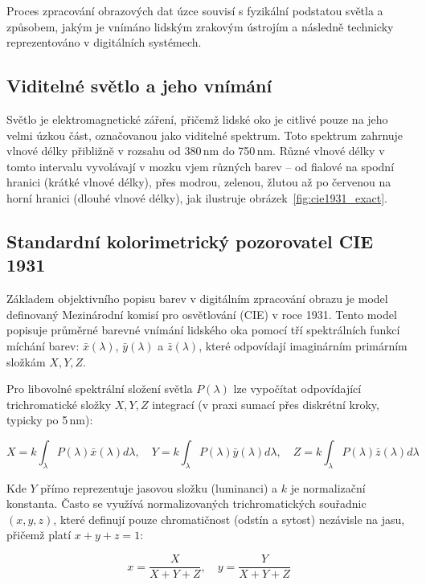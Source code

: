 \documentclass[FM,DP]{tulthesis}
\begin{document}
Proces zpracování obrazových dat úzce souvisí s fyzikální podstatou světla a
způsobem, jakým je vnímáno lidským zrakovým ústrojím a následně technicky
reprezentováno v digitálních systémech.

\subsection{Viditelné světlo a jeho vnímání}
Světlo je elektromagnetické záření, přičemž lidské oko je citlivé pouze na jeho
velmi úzkou část, označovanou jako viditelné spektrum. Toto spektrum zahrnuje
vlnové délky přibližně v rozsahu od 380\,nm do 750\,nm. Různé vlnové délky v
tomto intervalu vyvolávají v mozku vjem různých barev – od fialové na spodní
hranici (krátké vlnové délky), přes modrou, zelenou, žlutou až po červenou na
horní hranici (dlouhé vlnové délky), jak ilustruje
obrázek~\ref{fig:cie1931_exact}.

\subsection{Standardní kolorimetrický pozorovatel CIE 1931}
Základem objektivního popisu barev v digitálním zpracování obrazu je model
definovaný Mezinárodní komisí pro osvětlování (CIE) v roce 1931. Tento model
popisuje průměrné barevné vnímání lidského oka pomocí tří spektrálních funkcí
míchání barev: $\bar{x}(\lambda)$, $\bar{y}(\lambda)$ a $\bar{z}(\lambda)$,
které odpovídají imaginárním primárním složkám $X, Y, Z$.

Pro libovolné spektrální složení světla $P(\lambda)$ lze vypočítat odpovídající
trichromatické složky $X, Y, Z$ integrací (v praxi sumací přes diskrétní kroky,
typicky po 5\,nm):

\begin{equation}
    X = k \int_{\lambda} P(\lambda) \bar{x}(\lambda) d\lambda, \quad
    Y = k \int_{\lambda} P(\lambda) \bar{y}(\lambda) d\lambda, \quad
    Z = k \int_{\lambda} P(\lambda) \bar{z}(\lambda) d\lambda
\end{equation}

Kde $Y$ přímo reprezentuje jasovou složku (luminanci) a $k$ je normalizační
konstanta. Často se využívá normalizovaných trichromatických souřadnic $(x, y,
    z)$, které definují pouze chromatičnost (odstín a sytost) nezávisle na jasu,
přičemž platí $x+y+z=1$:

\begin{equation}
    x = \frac{X}{X+Y+Z}, \quad y = \frac{Y}{X+Y+Z}
\end{equation}
\end{document}
